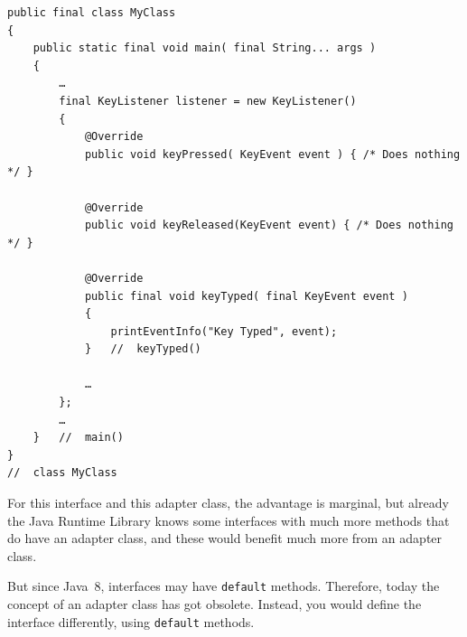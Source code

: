 \begin{lstlisting}
public final class MyClass 
{
    public static final void main( final String... args ) 
    {
        …
        final KeyListener listener = new KeyListener() 
        {
            @Override
            public void keyPressed( KeyEvent event ) { /* Does nothing */ }

            @Override
            public void keyReleased(KeyEvent event) { /* Does nothing */ }
            
            @Override
            public final void keyTyped( final KeyEvent event ) 
            {
                printEventInfo("Key Typed", event);
            }   //  keyTyped()
            
            …
        };
        …
    }   //  main()
}
//  class MyClass
\end{lstlisting}

For this interface and this adapter class, the advantage is marginal, but already the Java Runtime Library knows some interfaces with much more methods that do have an adapter class, and these would benefit much more from an adapter class.

But since Java~8, interfaces may have \lstinline|default| methods\autocite{ORACLE_TUTORIALS:DefaultMethods, ORACLE_DOC_LANGUAGE_SPECIFICATION:MethodDeclarationsInterface}. Therefore, today the concept of an adapter class has got obsolete. Instead, you would define the interface differently, using \lstinline|default| methods.

